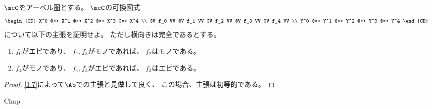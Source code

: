 \documentclass[uplatex,dvipdfmx]{jsarticle}
\begin{document}
\maketitle
\HeaderCommentA
\section{}
\fi


\begin{prob}\label{1.8}
  \(\mcC\)をアーベル圏とする。
  \(\mcC\)の可換図式
  \[
  \begin{CD}
    X^0 @>>> X^1 @>>> X^2 @>>> X^3 @>>> X^4 \\
    @V f_0 VV   @V f_1 VV   @V f_2 VV   @V f_3 VV   @V f_4 VV \\
    Y^0 @>>> Y^1 @>>> Y^2 @>>> Y^3 @>>> Y^4
  \end{CD}
  \]
  について以下の主張を証明せよ。
  ただし横向きは完全であるとする。
  \begin{enumerate}
    \item \label{1.8.1}
    \(f_0\)がエピであり、
    \(f_1,f_3\)がモノであれば、
    \(f_2\)はモノである。
    \item \label{1.8.2}
    \(f_4\)がモノであり、
    \(f_1,f_3\)がエピであれば、
    \(f_2\)はエピである。
  \end{enumerate}
\end{prob}

\begin{proof}
  \autoref{1.7}によって\(\Ab\)での主張と見做して良く、
  この場合、主張は初等的である。
\end{proof}


\ifcsname Chap\endcsname\else
\printbibliography
\end{document}
